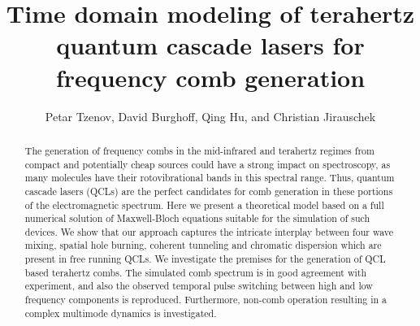 \documentclass[10pt]{article}
\begin{document}
	\title{Time domain modeling of terahertz quantum cascade lasers for frequency comb generation}
	\author{Petar Tzenov, David Burghoff, Qing Hu, and Christian
		Jirauschek}
	\address{Institute for Nanoelectronics, Technical University of Munich,
		D-80333 Munich, Germany} 
	\address{Department of Electrical Engineering
		and Computer Science, Research Laboratory of Electronics, Massachusetts
		Institute of Technology, Cambridge, Massachusetts 02139, USA}
	\begin{abstract}
		The generation of frequency combs in the mid-infrared and terahertz regimes
		from compact and potentially cheap sources could have a strong impact on
		spectroscopy, as many molecules have their rotovibrational bands in this
		spectral range. Thus, quantum cascade lasers (QCLs) are the perfect candidates
		for comb generation in these portions of the electromagnetic spectrum. Here we
		present a theoretical model based on a full numerical solution of
		Maxwell-Bloch equations suitable for the simulation of such devices. We show
		that our approach captures the intricate interplay between four wave mixing,
		spatial hole burning, coherent tunneling and chromatic dispersion which are
		present in free running QCLs. We investigate the premises for the generation
		of QCL based terahertz combs. The simulated comb spectrum is in good agreement
		with experiment, and also the observed temporal pulse switching between high
		and low frequency components is reproduced. Furthermore, non-comb operation
		resulting in a complex multimode dynamics is investigated.
	\end{abstract}
\end{document}
